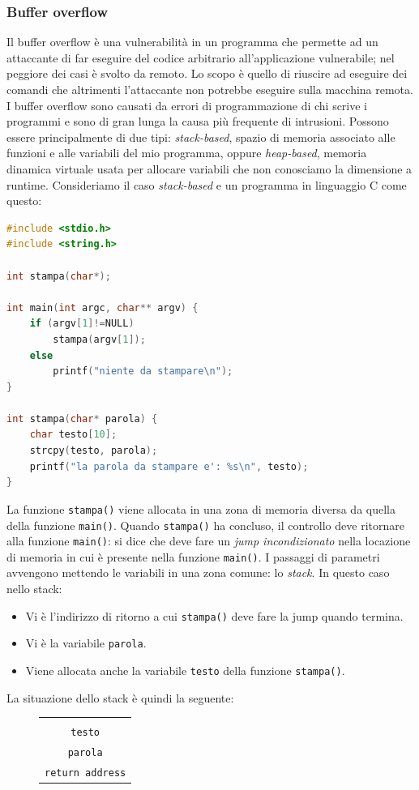 \subsubsection{Buffer overflow}
Il buffer overflow è una vulnerabilità in un programma che permette ad un attaccante di far eseguire del codice arbitrario all'applicazione vulnerabile; nel peggiore dei casi è svolto da remoto. Lo scopo è quello di riuscire ad eseguire dei comandi che altrimenti l'attaccante non potrebbe eseguire sulla macchina remota. I buffer overflow sono causati da errori di programmazione di chi scrive i programmi e sono di gran lunga la causa più frequente di intrusioni. Possono essere principalmente di due tipi: \textit{stack-based}, spazio di memoria associato alle funzioni e alle variabili del mio programma, oppure \textit{heap-based}, memoria dinamica virtuale usata per allocare variabili che non conosciamo la dimensione a runtime. Consideriamo il caso \textit{stack-based} e un programma in linguaggio C come questo:
\begin{lstlisting}[language=C]
#include <stdio.h>
#include <string.h>

int stampa(char*);

int main(int argc, char** argv) {
	if (argv[1]!=NULL)
		stampa(argv[1]);
	else
		printf("niente da stampare\n");
}
	
int stampa(char* parola) {
	char testo[10];
	strcpy(testo, parola);
	printf("la parola da stampare e': %s\n", testo);
}
\end{lstlisting}
La funzione \texttt{stampa()} viene allocata in una zona di memoria diversa da quella della funzione \texttt{main()}. Quando \texttt{stampa()} ha concluso, il controllo deve ritornare alla funzione \texttt{main()}: si dice che deve fare un \textit{jump incondizionato} nella locazione di memoria in cui è presente nella funzione \texttt{main()}. I passaggi di parametri avvengono mettendo le variabili in una zona comune: lo \textit{stack}. In questo caso nello stack:
\begin{itemize}
	\item Vi è l'indirizzo di ritorno a cui \texttt{stampa()} deve fare la jump quando termina.
	\item Vi è la variabile \texttt{parola}.
	\item Viene allocata anche la variabile \texttt{testo} della funzione \texttt{stampa()}.
\end{itemize}
La situazione dello stack è quindi la seguente:
\begin{figure}[htbp]
	\centering
	\begin{tabular}{|c|}
		\\ \\ \hline \\
		\hline
		\texttt{\small testo} \\
		\hline
		\texttt{\small parola} \\
		\hline
		\texttt{\small return address} \\
		\hline
	\end{tabular}
\end{figure}\\
